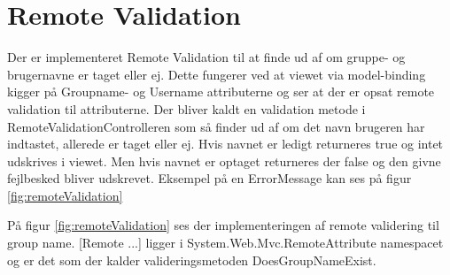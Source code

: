 \section{Remote Validation}\label{sec:remoteValidation}
Der er implementeret Remote Validation til at finde ud af om gruppe- og brugernavne er taget eller ej. Dette fungerer ved at viewet via model-binding kigger på Groupname- og Username attributerne og ser at der er opsat remote validation til attributerne. Der bliver kaldt en validation metode i RemoteValidationControlleren som så finder ud af om det navn brugeren har indtastet, allerede er taget eller ej. Hvis navnet er ledigt returneres true og intet udskrives i viewet. Men hvis navnet er optaget returneres der false og den givne fejlbesked bliver udskrevet. Eksempel på en ErrorMessage kan ses på figur \ref{fig:remoteValidation}


På figur \ref{fig:remoteValidation} ses der implementeringen af remote validering til group name. [Remote ...] ligger i System.Web.Mvc.RemoteAttribute namespacet og er det som der kalder valideringsmetoden DoesGroupNameExist.